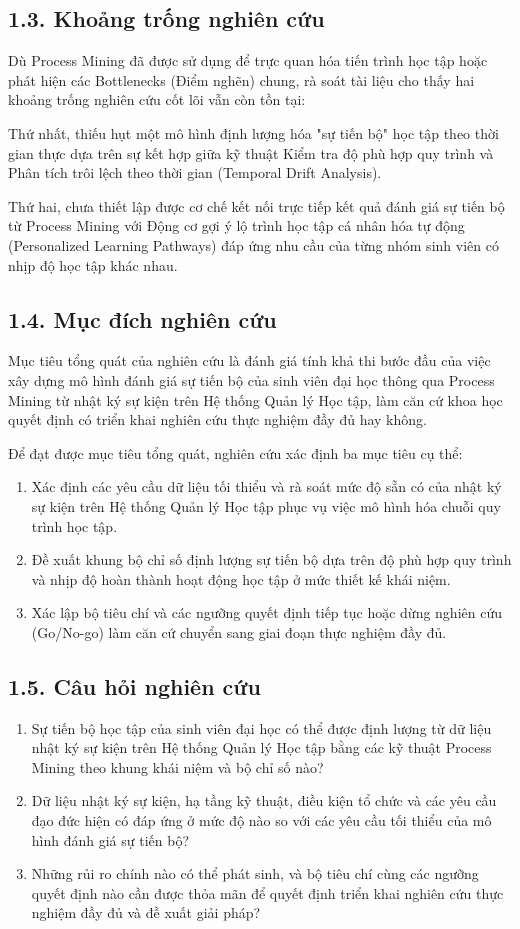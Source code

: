 \subsection{1.3. Khoảng trống nghiên cứu}
Dù Process Mining đã được sử dụng để trực quan hóa tiến trình học tập hoặc phát hiện các Bottlenecks (Điểm nghẽn) chung, rà soát tài liệu cho thấy hai khoảng trống nghiên cứu cốt lõi vẫn còn tồn tại:

Thứ nhất, thiếu hụt một mô hình định lượng hóa "sự tiến bộ" học tập theo thời gian thực dựa trên sự kết hợp giữa kỹ thuật Kiểm tra độ phù hợp quy trình và Phân tích trôi lệch theo thời gian (Temporal Drift Analysis).

Thứ hai, chưa thiết lập được cơ chế kết nối trực tiếp kết quả đánh giá sự tiến bộ từ Process Mining với Động cơ gợi ý lộ trình học tập cá nhân hóa tự động (Personalized Learning Pathways) đáp ứng nhu cầu của từng nhóm sinh viên có nhịp độ học tập khác nhau.

\subsection{1.4. Mục đích nghiên cứu}
Mục tiêu tổng quát của nghiên cứu là đánh giá tính khả thi bước đầu của việc xây dựng mô hình đánh giá sự tiến bộ của sinh viên đại học thông qua Process Mining từ nhật ký sự kiện trên Hệ thống Quản lý Học tập, làm căn cứ khoa học quyết định có triển khai nghiên cứu thực nghiệm đầy đủ hay không.

Để đạt được mục tiêu tổng quát, nghiên cứu xác định ba mục tiêu cụ thể:
\begin{enumerate}
    \item Xác định các yêu cầu dữ liệu tối thiểu và rà soát mức độ sẵn có của nhật ký sự kiện trên Hệ thống Quản lý Học tập phục vụ việc mô hình hóa chuỗi quy trình học tập.
    \item Đề xuất khung bộ chỉ số định lượng sự tiến bộ dựa trên độ phù hợp quy trình và nhịp độ hoàn thành hoạt động học tập ở mức thiết kế khái niệm.
    \item Xác lập bộ tiêu chí và các ngưỡng quyết định tiếp tục hoặc dừng nghiên cứu (Go/No-go) làm căn cứ chuyển sang giai đoạn thực nghiệm đầy đủ.
\end{enumerate}

\subsection{1.5. Câu hỏi nghiên cứu}
\begin{enumerate}
    \item Sự tiến bộ học tập của sinh viên đại học có thể được định lượng từ dữ liệu nhật ký sự kiện trên Hệ thống Quản lý Học tập bằng các kỹ thuật Process Mining theo khung khái niệm và bộ chỉ số nào?
    \item Dữ liệu nhật ký sự kiện, hạ tầng kỹ thuật, điều kiện tổ chức và các yêu cầu đạo đức hiện có đáp ứng ở mức độ nào so với các yêu cầu tối thiểu của mô hình đánh giá sự tiến bộ?
    \item Những rủi ro chính nào có thể phát sinh, và bộ tiêu chí cùng các ngưỡng quyết định nào cần được thỏa mãn để quyết định triển khai nghiên cứu thực nghiệm đầy đủ và đề xuất giải pháp?
\end{enumerate}
